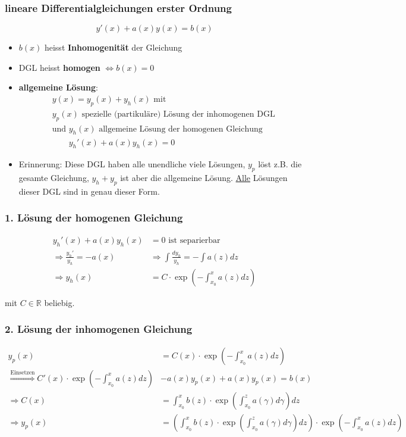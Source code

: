 \documentclass[a4paper]{article}
\newcommand{\R}{\mathbb{R}}
\begin{document}
\subsubsection{lineare Differentialgleichungen erster Ordnung}
\[
	y' (x) + a(x) y(x) = b(x)
\] 
\begin{itemize}
	\item $b(x)$ heisst \textbf{Inhomogenität} der Gleichung 
	\item DGL heisst \textbf{homogen} $\Leftrightarrow b(x) = 0$
	\item \textbf{allgemeine Lösung}:
		\begin{align*}
			& y(x) = y_p (x) + y_h (x) \text{ mit } \\
			& y_p(x) \text{ spezielle (partikuläre) Lösung der inhomogenen DGL } 
			\\
			& \text{und } y_h (x)
			\text{ allgemeine Lösung der homogenen Gleichung}\\
			& \qquad y_h '(x) + a(x) y_h (x) = 0
		\end{align*}
	\item Erinnerung: Diese DGL haben alle unendliche viele Lösungen,
		$y_p$ löst z.B. die gesamte Gleichung, $y_h + y_p$ ist aber die
		allgemeine Lösung. \underline{Alle} Lösungen dieser DGL
		sind in genau dieser Form.
\end{itemize}

\subsubsection*{1. Lösung der homogenen Gleichung}
\begin{align*}
	y_h '(x) + a(x) y_h (x) &= 0 \text{ ist separierbar } \\
	\Rightarrow \frac{ y_h ' }{ y_h } = -a(x) 
	&\Rightarrow
	\int \frac{ d y_h }{ y_h } = - \int a(z) dz
	\\
	\Rightarrow
	y_h (x) &= C \cdot \exp \left(
		- \int_{x_0}^{x} a(z) dz 
	\right) 
\end{align*}

mit $C \in \R$ beliebig.

\subsubsection*{2. Lösung der inhomogenen Gleichung}
\begin{align*}
	y_p (x) &= C(x) \cdot \exp \left(
		- \int_{x_0}^{x} a(z) dz 
	\right) \\
	\overset{\text{Einsetzen}} \Longrightarrow
	C' (x) \cdot \exp \left(
		- \int_{x_0}^{x} a(z) dz 
	\right) &- a(x) y_p (x) + a(x) y_p (x) = b(x) \\
	\Rightarrow C(x) &= 
	\int_{x_0}^{x} b(z) \cdot \exp \left(
		\int_{x_0}^{z} a (\gamma) d \gamma 
	\right) dz \\
	\Rightarrow y_p (x) &= 
	\left(
		\int_{x_0}^{x} b(z) \cdot \exp \left(
			\int_{x_0}^{z} a (\gamma) d \gamma 
		\right) dz
	\right) \cdot \exp \left(
		- \int_{x_0}^{x} a(z) dz 
	\right)
\end{align*}
\end{document}
